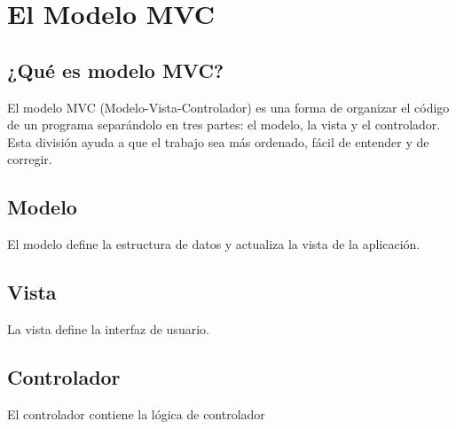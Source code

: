 \chapter{El Modelo MVC}

\newpage

\section{¿Qué es modelo MVC?}

El modelo MVC (Modelo-Vista-Controlador) es una forma de organizar el código de un programa separándolo en tres partes: el modelo, la vista y el controlador. Esta división ayuda a que el trabajo sea más ordenado, fácil de entender y de corregir.

\section{Modelo}

El modelo define la estructura de datos y actualiza la vista de la aplicación.

\section{Vista}

La vista define la interfaz de usuario.

\section{Controlador}

El controlador contiene la lógica de controlador